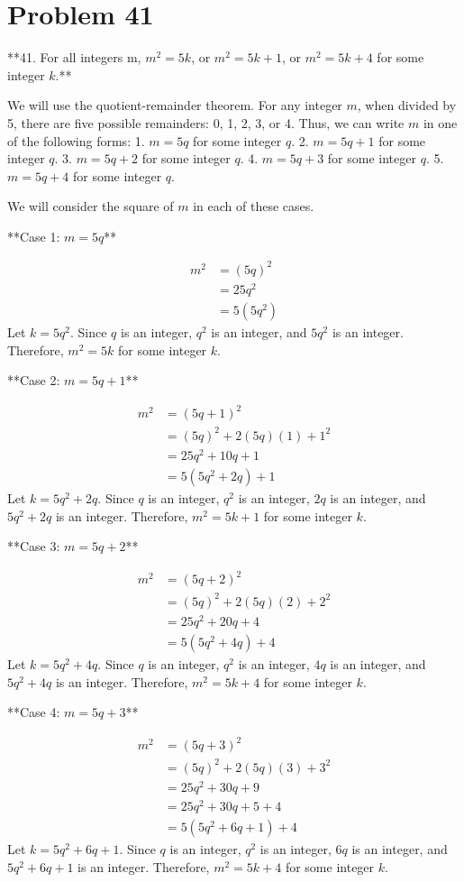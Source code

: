 \documentclass{article}
\begin{document}
\section*{Problem 41}
**41. For all integers m, $m^2 = 5k$, or $m^2 = 5k + 1$, or $m^2 = 5k + 4$ for some integer $k$.**

We will use the quotient-remainder theorem. For any integer $m$, when divided by 5, there are five possible remainders: 0, 1, 2, 3, or 4. Thus, we can write $m$ in one of the following forms:
1. $m = 5q$ for some integer $q$.
2. $m = 5q + 1$ for some integer $q$.
3. $m = 5q + 2$ for some integer $q$.
4. $m = 5q + 3$ for some integer $q$.
5. $m = 5q + 4$ for some integer $q$.

We will consider the square of $m$ in each of these cases.

**Case 1: $m = 5q$**

\begin{align*} m^2 &= (5q)^2 \\ &= 25q^2 \\ &= 5(5q^2) \end{align*}
Let $k = 5q^2$. Since $q$ is an integer, $q^2$ is an integer, and $5q^2$ is an integer. Therefore, $m^2 = 5k$ for some integer $k$.

**Case 2: $m = 5q + 1$**

\begin{align*} m^2 &= (5q + 1)^2 \\ &= (5q)^2 + 2(5q)(1) + 1^2 \\ &= 25q^2 + 10q + 1 \\ &= 5(5q^2 + 2q) + 1 \end{align*}
Let $k = 5q^2 + 2q$. Since $q$ is an integer, $q^2$ is an integer, $2q$ is an integer, and $5q^2 + 2q$ is an integer. Therefore, $m^2 = 5k + 1$ for some integer $k$.

**Case 3: $m = 5q + 2$**

\begin{align*} m^2 &= (5q + 2)^2 \\ &= (5q)^2 + 2(5q)(2) + 2^2 \\ &= 25q^2 + 20q + 4 \\ &= 5(5q^2 + 4q) + 4 \end{align*}
Let $k = 5q^2 + 4q$. Since $q$ is an integer, $q^2$ is an integer, $4q$ is an integer, and $5q^2 + 4q$ is an integer. Therefore, $m^2 = 5k + 4$ for some integer $k$.

**Case 4: $m = 5q + 3$**

\begin{align*} m^2 &= (5q + 3)^2 \\ &= (5q)^2 + 2(5q)(3) + 3^2 \\ &= 25q^2 + 30q + 9 \\ &= 25q^2 + 30q + 5 + 4 \\ &= 5(5q^2 + 6q + 1) + 4 \end{align*}
Let $k = 5q^2 + 6q + 1$. Since $q$ is an integer, $q^2$ is an integer, $6q$ is an integer, and $5q^2 + 6q + 1$ is an integer. Therefore, $m^2 = 5k + 4$ for some integer $k$.
\end{document}
